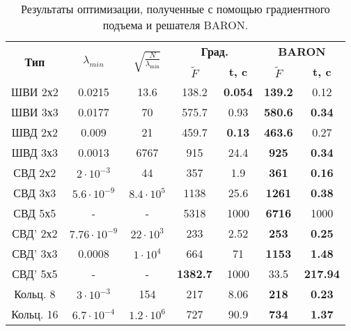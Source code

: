 \begin{table}[!h]
\centering
\begin{tabular}{|c|c|c|c c|c c|}
    \hline
    \multirow{2}{*}{\textbf{Тип}} & \multirow{2}{*}{$\lambda_{min}$} & \multirow{2}{*}{$\sqrt{\frac{N}{\lambda_{\min}}}$} & \multicolumn{2}{c}{\textbf{Град.}} & \multicolumn{2}{|c|}{\textbf{BARON}}\\
    & & & \textbf{$\tilde{F}$} & \textbf{t, c} & \textbf{$\tilde{F}$} & \textbf{t, c} \\
    \hline
    ШВИ 2х2 & 0.0215 & 13.6 & 138.2 & \textbf{0.054} & \textbf{139.2} & 0.12 \\
    ШВИ 3х3 & 0.0177 & 70 & 575.7 & 0.93 & \textbf{580.6} & \textbf{0.34} \\
    ШВД 2х2 & 0.009 & 21 & 459.7 & \textbf{0.13} & \textbf{463.6} & 0.27 \\
    ШВД 3х3 & 0.0013 & 6767 & 915 & 24.4 & \textbf{925} & \textbf{0.34}  \\
    СВД 2х2 & $2\cdot10^{-3}$ & 44& 357 & 1.9 & \textbf{361} & \textbf{0.16} \\
    СВД 3х3 & $5.6\cdot10^{-9}$ & $8.4\cdot10^{5}$& 1138 & 25.6 & \textbf{1261} & \textbf{0.38}\\
    СВД 5х5 & - & - & 5318 & 1000 & \textbf{6716} & 1000 \\
    СВД' 2х2 & $7.76\cdot10^{-9}$ & $22\cdot10^{3}$ & 233 & 2.52 & \textbf{253} & \textbf{0.25} \\
    СВД' 3х3 & 0.0008 & $1\cdot10^4$& 664 & 71 & \textbf{1153} & \textbf{1.48} \\
    СВД' 5х5 & - & - & \textbf{1382.7} & 1000 & 33.5 & \textbf{217.94}  \\
    Кольц. 8 & $3\cdot10^{-3}$ & 154 & 217 & 8.06 & \textbf{218} & \textbf{0.23} \\
    Кольц. 16 & $6.7\cdot10^{-4}$ & $1.2\cdot10^{6}$& 727 & 90.9 & \textbf{734} & \textbf{1.37} \\
    \hline
\end{tabular}
\caption{ Результаты оптимизации, полученные с помощью градиентного подъема и решателя BARON.}
\label{tab:results}
\end{table}

